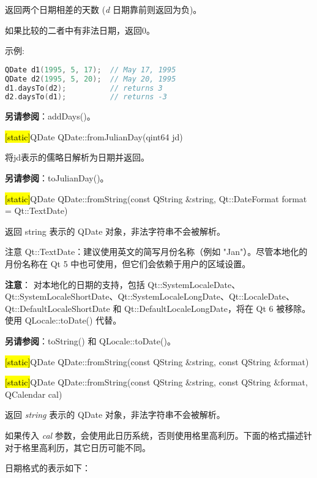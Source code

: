 返回两个日期相差的天数 (\emph{d} 日期靠前则返回为负)。

如果比较的二者中有非法日期，返回0。

示例:

\begin{lstlisting}[language=C++]
QDate d1(1995, 5, 17);  // May 17, 1995
QDate d2(1995, 5, 20);  // May 20, 1995
d1.daysTo(d2);          // returns 3
d2.daysTo(d1);          // returns -3
\end{lstlisting}

\textbf{另请参阅}：addDays()。

\splitLine

\hl{[static]}QDate QDate::fromJulianDay(qint64 jd)

将jd表示的儒略日解析为日期并返回。

\textbf{另请参阅}：toJulianDay()。

\splitLine

\hl{[static]}QDate QDate::fromString(const QString \&string,
Qt::DateFormat format = Qt::TextDate)

返回 string 表示的 QDate 对象，非法字符串不会被解析。

注意 Qt::TextDate：建议使用英文的简写月份名称（例如 "Jan"）。尽管本地化的月份名称在 Qt 5 中也可使用，但它们会依赖于用户的区域设置。

\textbf{注意}： 对本地化的日期的支持，包括 Qt::SystemLocaleDate、Qt::SystemLocaleShortDate、Qt::SystemLocaleLongDate、Qt::LocaleDate、Qt::DefaultLocaleShortDate 和 Qt::DefaultLocaleLongDate，将在 Qt 6 被移除。使用 QLocale::toDate() 代替。

\textbf{另请参阅}：toString() 和 QLocale::toDate()。

\splitLine

\hl{[static]}QDate QDate::fromString(const QString \&string, const QString
\&format)

\hl{[static]}QDate QDate::fromString(const QString \&string, const QString
\&format, QCalendar cal)

返回 \emph{string}  表示的 QDate 对象，非法字符串不会被解析。

如果传入 \emph{cal} 参数，会使用此日历系统，否则使用格里高利历。下面的格式描述针对于格里高利历，其它日历可能不同。

日期格式的表示如下：

